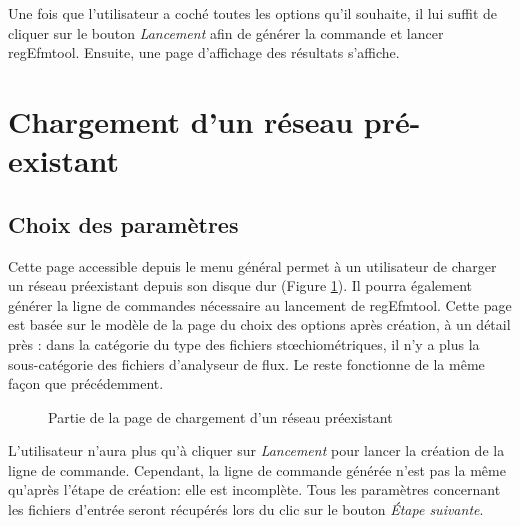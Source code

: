 Une fois que l'utilisateur a coché toutes les options qu'il souhaite, il lui suffit de cliquer sur le bouton \emph{Lancement} afin de générer la commande et lancer regEfmtool. Ensuite, une page d'affichage des résultats s'affiche. 

\section{Chargement d'un réseau pré-existant}

\subsection{Choix des paramètres}
Cette page accessible depuis le menu général permet à un utilisateur de charger un réseau préexistant depuis son disque dur (Figure \ref{chargement1}). Il pourra également générer la ligne de commandes nécessaire au lancement de regEfmtool. Cette page est basée sur le modèle de la page du choix des options après création, à un détail près : dans la catégorie du type des fichiers stœchiométriques, il n'y a plus la sous-catégorie des fichiers d'analyseur de flux. Le reste fonctionne de la m\^eme façon que précédemment. \\

\begin{figure}[!ht]
	\begin{center}
		\caption{Partie de la page de chargement d'un réseau préexistant}
  		\label{chargement1}
  	\end{center}	
\end{figure}

L'utilisateur n'aura plus qu'à cliquer sur \textit{Lancement} pour lancer la création de la ligne de commande. Cependant, la ligne de commande générée n'est pas la m\^eme qu'après l'étape de création: elle est incomplète. Tous les paramètres concernant les fichiers d'entrée seront récupérés lors du clic sur le bouton \textit{Étape suivante}. 

